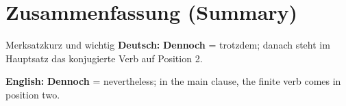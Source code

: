 \documentclass[a4paper,11pt]{article}
\newcommand{\GermanText}[1]{\textbf{Deutsch: }#1\par}\newcommand{\EnglishText}[1]{{\small\color{SoftGray}\textbf{English: }#1\par}}\newcommand{\ExampleItem}[2]{\item \textbf{#1}\\{\small\color{SoftGray}#2}}
\begin{document}
\section{Zusammenfassung \textnormal{(Summary)}}
\begin{grammarentry}{Merksatz}{kurz und wichtig}
\GermanText{\textbf{Dennoch} = \glqq trotzdem\grqq; danach steht im Hauptsatz das konjugierte Verb auf Position 2.}
\EnglishText{\textbf{Dennoch} = \glqq nevertheless\grqq; in the main clause, the finite verb comes in position two.}
\end{grammarentry}
\end{document}

